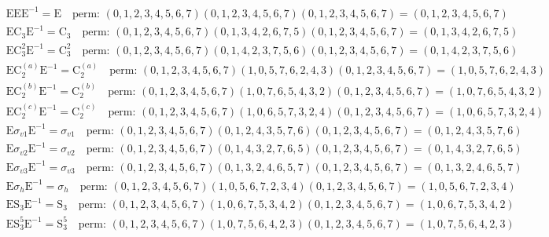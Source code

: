 \begin{align*}
& \mathrm{E} \mathrm{E} \mathrm{E}^{-1} = \mathrm{E} \quad \text{perm: }(0, 1, 2, 3, 4, 5, 6, 7)(0, 1, 2, 3, 4, 5, 6, 7)(0, 1, 2, 3, 4, 5, 6, 7) = (0, 1, 2, 3, 4, 5, 6, 7) \\
& \mathrm{E} \mathrm{C}_{3} \mathrm{E}^{-1} = \mathrm{C}_{3} \quad \text{perm: }(0, 1, 2, 3, 4, 5, 6, 7)(0, 1, 3, 4, 2, 6, 7, 5)(0, 1, 2, 3, 4, 5, 6, 7) = (0, 1, 3, 4, 2, 6, 7, 5) \\
& \mathrm{E} \mathrm{C}_{3}^{2} \mathrm{E}^{-1} = \mathrm{C}_{3}^{2} \quad \text{perm: }(0, 1, 2, 3, 4, 5, 6, 7)(0, 1, 4, 2, 3, 7, 5, 6)(0, 1, 2, 3, 4, 5, 6, 7) = (0, 1, 4, 2, 3, 7, 5, 6) \\
& \mathrm{E} \mathrm{C}_{2}^{(a)} \mathrm{E}^{-1} = \mathrm{C}_{2}^{(a)} \quad \text{perm: }(0, 1, 2, 3, 4, 5, 6, 7)(1, 0, 5, 7, 6, 2, 4, 3)(0, 1, 2, 3, 4, 5, 6, 7) = (1, 0, 5, 7, 6, 2, 4, 3) \\
& \mathrm{E} \mathrm{C}_{2}^{(b)} \mathrm{E}^{-1} = \mathrm{C}_{2}^{(b)} \quad \text{perm: }(0, 1, 2, 3, 4, 5, 6, 7)(1, 0, 7, 6, 5, 4, 3, 2)(0, 1, 2, 3, 4, 5, 6, 7) = (1, 0, 7, 6, 5, 4, 3, 2) \\
& \mathrm{E} \mathrm{C}_{2}^{(c)} \mathrm{E}^{-1} = \mathrm{C}_{2}^{(c)} \quad \text{perm: }(0, 1, 2, 3, 4, 5, 6, 7)(1, 0, 6, 5, 7, 3, 2, 4)(0, 1, 2, 3, 4, 5, 6, 7) = (1, 0, 6, 5, 7, 3, 2, 4) \\
& \mathrm{E} \sigma_{v1} \mathrm{E}^{-1} = \sigma_{v1} \quad \text{perm: }(0, 1, 2, 3, 4, 5, 6, 7)(0, 1, 2, 4, 3, 5, 7, 6)(0, 1, 2, 3, 4, 5, 6, 7) = (0, 1, 2, 4, 3, 5, 7, 6) \\
& \mathrm{E} \sigma_{v2} \mathrm{E}^{-1} = \sigma_{v2} \quad \text{perm: }(0, 1, 2, 3, 4, 5, 6, 7)(0, 1, 4, 3, 2, 7, 6, 5)(0, 1, 2, 3, 4, 5, 6, 7) = (0, 1, 4, 3, 2, 7, 6, 5) \\
& \mathrm{E} \sigma_{v3} \mathrm{E}^{-1} = \sigma_{v3} \quad \text{perm: }(0, 1, 2, 3, 4, 5, 6, 7)(0, 1, 3, 2, 4, 6, 5, 7)(0, 1, 2, 3, 4, 5, 6, 7) = (0, 1, 3, 2, 4, 6, 5, 7) \\
& \mathrm{E} \sigma_{h} \mathrm{E}^{-1} = \sigma_{h} \quad \text{perm: }(0, 1, 2, 3, 4, 5, 6, 7)(1, 0, 5, 6, 7, 2, 3, 4)(0, 1, 2, 3, 4, 5, 6, 7) = (1, 0, 5, 6, 7, 2, 3, 4) \\
& \mathrm{E} \mathrm{S}_{3} \mathrm{E}^{-1} = \mathrm{S}_{3} \quad \text{perm: }(0, 1, 2, 3, 4, 5, 6, 7)(1, 0, 6, 7, 5, 3, 4, 2)(0, 1, 2, 3, 4, 5, 6, 7) = (1, 0, 6, 7, 5, 3, 4, 2) \\
& \mathrm{E} \mathrm{S}_{3}^{5} \mathrm{E}^{-1} = \mathrm{S}_{3}^{5} \quad \text{perm: }(0, 1, 2, 3, 4, 5, 6, 7)(1, 0, 7, 5, 6, 4, 2, 3)(0, 1, 2, 3, 4, 5, 6, 7) = (1, 0, 7, 5, 6, 4, 2, 3) \\

\end{align*}
